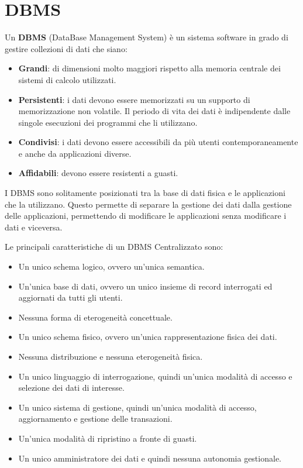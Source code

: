 \chapter{DBMS}
\begin{definizione}
    Un \textbf{DBMS} (DataBase Management System) è un sistema software in grado
    di gestire collezioni di dati che siano:
    \begin{itemize}
        \item \textbf{Grandi}: di dimensioni molto maggiori rispetto alla memoria
              centrale dei sistemi di calcolo utilizzati.
        \item \textbf{Persistenti}: i dati devono essere memorizzati su un
              supporto di memorizzazione non volatile. Il periodo di vita dei
              dati è indipendente dalle singole esecuzioni dei programmi che li
              utilizzano.
        \item \textbf{Condivisi}: i dati devono essere accessibili da più utenti
              contemporaneamente e anche da applicazioni diverse.
        \item \textbf{Affidabili}: devono essere resistenti a guasti.
    \end{itemize}
\end{definizione}
I DBMS sono solitamente posizionati tra la base di dati fisica e le applicazioni
che la utilizzano. Questo permette di separare la gestione dei dati dalla
gestione delle applicazioni, permettendo di modificare le applicazioni senza
modificare i dati e viceversa.

Le principali caratteristiche di un DBMS Centralizzato sono:
\begin{itemize}
    \item Un unico schema logico, ovvero un'unica semantica.
    \item Un'unica base di dati, ovvero un unico insieme di record interrogati
          ed aggiornati da tutti gli utenti.
    \item Nessuna forma di eterogeneità concettuale.
    \item Un unico schema fisico, ovvero un'unica rappresentazione fisica dei
          dati.
    \item Nessuna distribuzione e nessuna eterogeneità fisica.
    \item Un unico linguaggio di interrogazione, quindi un'unica modalità di
          accesso e selezione dei dati di interesse.
    \item Un unico sistema di gestione, quindi un'unica modalità di accesso,
          aggiornamento e gestione delle transazioni.
    \item Un'unica modalità di ripristino a fronte di guasti.
    \item Un unico amministratore dei dati e quindi nessuna autonomia gestionale.
\end{itemize}

